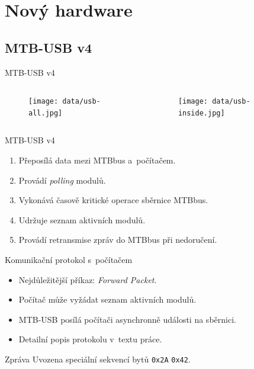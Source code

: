 \documentclass[aspectratio=169]{beamer}
\begin{document}
\section{Nový hardware}
\subsection{MTB-USB v4}

\begin{frame}{MTB-USB v4}
\begin{columns}
	\begin{column}{.4\textwidth}
		\begin{figure}
		\texttt{[image: data/usb-all.jpg]}
		\end{figure}
	\end{column}
	\begin{column}{.6\textwidth}
		\begin{figure}
		\texttt{[image: data/usb-inside.jpg]}
		\end{figure}
	\end{column}
\end{columns}
\end{frame}


\begin{frame}{MTB-USB v4}
\begin{enumerate}
\item Přeposílá data mezi MTBbus a počítačem.
\item Provádí \textit{polling} modulů.
\item Vykonává časově kritické operace sběrnice MTBbus.
\item Udržuje seznam aktivních modulů.
\item Provádí retransmise zpráv do MTBbus při nedoručení.
\end{enumerate}
\end{frame}


\begin{frame}{Komunikační protokol s počítačem}
\begin{itemize}
\item Nejdůležitější příkaz: \textit{Forward Packet}.
\item Počítač může vyžádat seznam aktivních modulů.
\item MTB-USB posílá počítači asynchronně události na sběrnici.
\item Detailní popis protokolu v textu práce.
\end{itemize}

\begin{alertblock}{Zpráva}
Uvozena speciální sekvencí bytů \texttt{0x2A} \texttt{0x42}.
\end{alertblock}
\end{frame}
\end{document}
